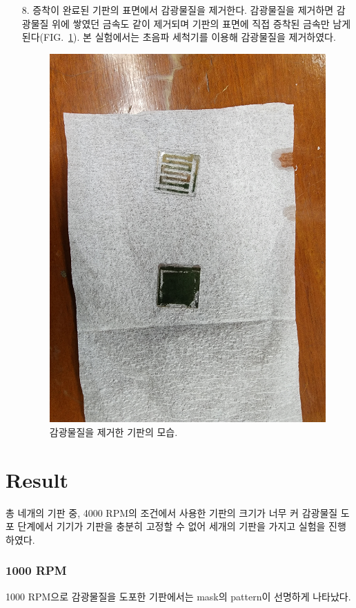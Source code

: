 \documentclass[aps,reprint,superscriptaddress,10pt]{revtex4-2}
\begin{document}
\begin{itemize}
  \item[8. ] 증착이 완료된 기판의 표면에서 감광물질을 제거한다. 감광물질을 제거하면
  감광물질 위에 쌓였던 금속도 같이 제거되며 기판의 표면에 직접 증착된 금속만 
  남게된다(FIG.~\ref{fig:result}).
  본 실험에서는 초음파 세척기를 이용해 감광물질을 제거하였다.
  \begin{figure}[htbp]
    \centering
    \includegraphics[scale=0.05, angle=0]{result.JPG}
    \caption{감광물질을 제거한 기판의 모습.}
    \label{fig:result}
  \end{figure}
\end{itemize}

\newpage
\section{Result}
총 네개의 기판 중, 4000 RPM의 조건에서 사용한 기판의 크기가 너무 커 감광물질 도포 단계에서
기기가 기판을 충분히 고정할 수 없어 세개의 기판을 가지고 실험을 진행하였다.
\subsubsection{1000 RPM}
  1000 RPM으로 감광물질을 도포한 기판에서는 mask의 pattern이 선명하게 나타났다. 
\end{document}
